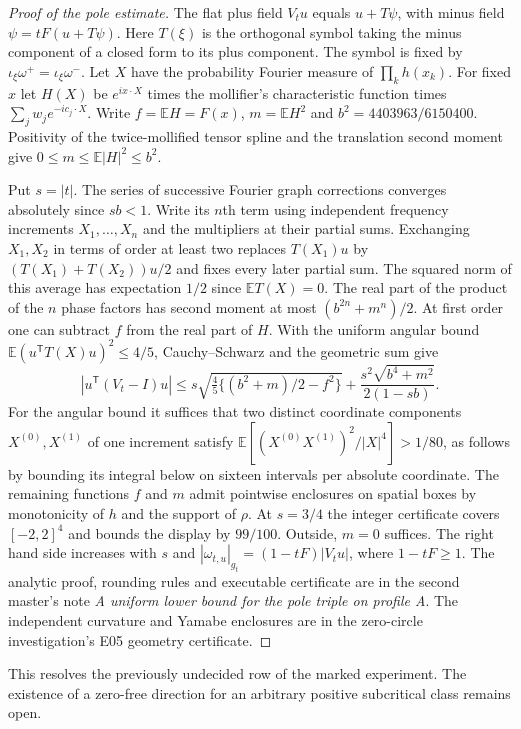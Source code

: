 \documentclass[11pt,letterpaper]{article}
\numberwithin{equation}{section}
\begin{document}
\begin{proof}[Proof of the pole estimate]
The flat plus field $V_tu$ equals $u+T\psi$, with minus field
$\psi=tF(u+T\psi)$. Here $T(\xi)$ is the orthogonal symbol taking the
minus component of a closed form to its plus component. The symbol is
fixed by $\iota_\xi\omega^+=\iota_\xi\omega^-$.
Let $X$ have the probability Fourier measure of $\prod_k h(x_k)$.
For fixed $x$ let $H(X)$ be $e^{ix\cdot X}$ times the mollifier's
characteristic function times $\sum_jw_j e^{-ic_j\cdot X}$. Write
$f=\mathbb E H=F(x)$, $m=\mathbb E H^2$ and
$b^2=4403963/6150400$. Positivity of the twice-mollified tensor spline
and the translation second moment give $0\le m\le\mathbb E|H|^2\le b^2$.

Put $s=|t|$. The series of successive Fourier graph corrections
converges absolutely since $sb<1$. Write its $n$th term using independent
frequency increments $X_1,\ldots,X_n$ and the multipliers at their
partial sums. Exchanging $X_1,X_2$ in terms of order at least two replaces
$T(X_1)u$ by $(T(X_1)+T(X_2))u/2$ and fixes every later partial sum.
The squared norm of this average has expectation $1/2$ since
$\mathbb E T(X)=0$. The real part of the product of the $n$ phase
factors has second moment at most $(b^{2n}+m^n)/2$. At first order
one can subtract $f$ from the real part of $H$. With the uniform
angular bound $\mathbb E(u^{\mathsf T}T(X)u)^2\le4/5$,
Cauchy--Schwarz and the geometric sum give
\[
 |u^{\mathsf T}(V_t-I)u|\le
 s\sqrt{\tfrac45\{(b^2+m)/2-f^2\}}+
 \frac{s^2\sqrt{b^4+m^2}}{2(1-sb)}.
\]
For the angular bound it suffices that two distinct coordinate components
$X^{(0)},X^{(1)}$ of one increment satisfy
$\mathbb E[(X^{(0)}X^{(1)})^2/|X|^4]>1/80$, as follows by bounding its integral
below on sixteen intervals per absolute coordinate.
The remaining functions $f$ and $m$ admit pointwise enclosures on
spatial boxes by monotonicity of $h$ and the support of $\rho$.
At $s=3/4$ the integer certificate covers $[-2,2]^4$ and bounds the
display by $99/100$. Outside, $m=0$ suffices. The right hand side
increases with $s$ and $|\omega_{t,u}|_{g_t}=(1-tF)|V_tu|$, where
$1-tF\ge1$. The analytic proof, rounding rules and executable certificate
are in the second master's note \emph{A uniform lower bound for the pole
triple on profile A}. The independent curvature and Yamabe enclosures
are in the zero-circle investigation's E05 geometry certificate.
\end{proof}

This resolves the previously undecided row of the marked experiment.
The existence of a zero-free direction for an arbitrary positive
subcritical class remains open.
\end{document}
